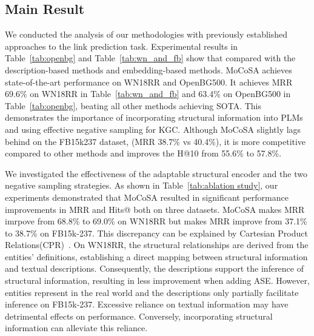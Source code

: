 \documentclass[11pt]{article}
\begin{document}
\subsection{Main Result}
We conducted the analysis of our methodologies with previously established approaches to the link prediction task. Experimental results in Table~\ref{tab:openbg} and Table~\ref{tab:wn_and_fb} show that compared with the description-based methods and embedding-based methods. MoCoSA achieves state-of-the-art performance on WN18RR and OpenBG500. It achieves MRR 69.6\% on WN18RR in Table~\ref{tab:wn_and_fb} and 63.4\% on OpenBG500 in Table~\ref{tab:openbg}, beating all other methods achieving SOTA. This demonstrates the importance of incorporating structural information into PLMs and using effective negative sampling for KGC. Although MoCoSA slightly lags behind on the FB15k237 dataset, (MRR 38.7\% vs 40.4\%), it is more competitive compared to other methods and improves the H@10 from 55.6\% to 57.8\%.  

We investigated the effectiveness of the adaptable structural encoder and the two negative sampling strategies. As shown in Table~\ref{tab:ablation study}, our experiments demonstrated that MoCoSA resulted in significant performance improvements in MRR and Hits@ both on three datasets. MoCoSA makes MRR imrpove from 68.8\% to 69.0\% on WN18RR but makes MRR improve from 37.1\% to 38.7\% on FB15k-237. This discrepancy can be explained by Cartesian Product Relations(CPR)~\cite{Chen2022KnowledgeIF, Lv2022DoPM, Akrami2020RealisticRO}. On WN18RR, the structural relationships are derived from the entities' definitions, establishing a direct mapping between structural information and textual descriptions. Consequently, the descriptions support the inference of structural information, resulting in less improvement when adding ASE. However, entities represent in the real world and the descriptions only partially facilitate inference on FB15k-237. Excessive reliance on textual information may have detrimental effects on performance. Conversely, incorporating structural information can alleviate this reliance.
\end{document}
